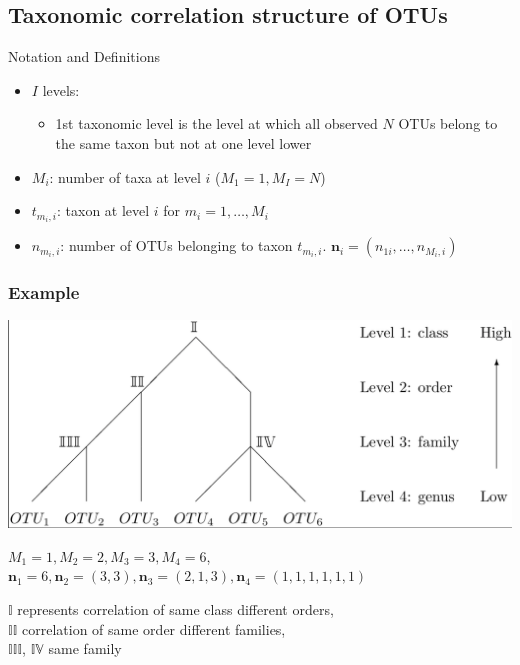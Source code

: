 \documentclass{beamer}
\begin{document}
\subsection{Taxonomic correlation structure of OTUs}

\begin{frame}[t]{Notation and Definitions}
  \begin{itemize}
    \item $I$ levels:
    \begin{itemize}
      \item 1st taxonomic level is the level at which all observed $N$ OTUs belong to the same taxon but not at one level lower
    \end{itemize}
    \item $M_i$: number of taxa at level $i$ ($M_1 = 1, M_I = N$)
    \item $t_{m_i, i}$: taxon at level $i$ for $m_i = 1, \ldots , M_i$
    \item $n_{m_i, i}$: number of OTUs belonging to taxon $t_{m_i,i}$. $\mathbf{n}_i = (n_{1i}, \ldots , n_{M_i,i})$

  \end{itemize}
\end{frame}




\begin{frame}
\frametitle{Example}

\includegraphics[width = \textwidth]{otu_tree.png}

$M_1 = 1, M_2 = 2, M_3 = 3, M_4 = 6$, $\boldsymbol n_1 = 6, \boldsymbol n_2 = (3,3), \boldsymbol n_3 = (2,1,3), \boldsymbol n_4 = (1,1,1,1,1,1)$

$\mathbb{I}$ represents correlation of same class different orders,\\ $\mathbb{II}$ correlation of same order different families,\\
$\mathbb{III}$, $\mathbb{IV}$ same family

\end{frame}
\end{document}
